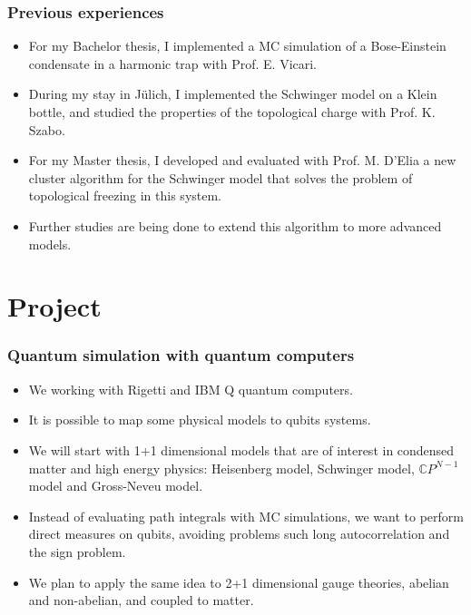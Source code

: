 \documentclass[11pt,t,xcolor=dvipsnames,aspectratio=169]{beamer}
\begin{document}
\begin{frame}
    \frametitle{Previous experiences}
    \begin{itemize}
        \item
            For my Bachelor thesis, I implemented a MC simulation of a Bose-Einstein condensate in a harmonic trap with Prof. E. Vicari.
        \item
            During my stay in J\"ulich, I implemented the Schwinger model on a Klein bottle, and studied the properties of the topological charge with Prof. K. Szabo.
        \item
            For my Master thesis, 
            I developed and evaluated with Prof. M. D'Elia
            a new cluster algorithm for the Schwinger model that solves the problem of topological freezing in this system.
        \item
            Further studies are being done to extend this algorithm to more advanced models.
    \end{itemize}
\end{frame}

\section{Project}

\begin{frame}
    \frametitle{Quantum simulation with quantum computers}
    \begin{itemize}
        \item
            We working with Rigetti and IBM Q quantum computers.
        \item
            It is possible to map some physical models to qubits systems.
        \item
            We will start with 1+1 dimensional models that are of interest in condensed matter and high energy physics:
            Heisenberg model, Schwinger model, $\mathbb CP^{N-1}$ model and Gross-Neveu model.
        \item
            Instead of evaluating path integrals with MC simulations,
            we want to perform direct measures on qubits, avoiding problems such long autocorrelation and the sign problem.
        \item
            We plan to apply the same idea to 2+1 dimensional gauge theories, abelian and non-abelian, and coupled to matter.
    \end{itemize}
\end{frame}
\end{document}
